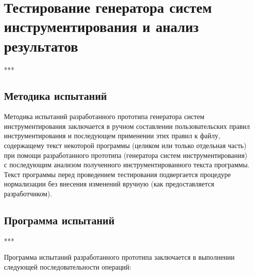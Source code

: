 \chapter{Тестирование генератора систем инструментирования и анализ результатов}

***

\section{Методика испытаний}

Методика испытаний разработанного прототипа генератора систем инструментирования заключается в ручном составлении пользовательских правил инструментирования и последующем применении этих правил к файлу, содержащему текст некоторой программы (целиком или только отдельная часть) при помощи разработанного прототипа (генератора систем инструментирования) с последующим анализом полученного инструментированного текста программы.
Текст программы перед проведением тестирования подвергается процедуре нормализации без внесения изменений вручную (как предоставляется разработчиком).

\section{Программа испытаний}

***

Программа испытаний разработанного прототипа заключается в выполнении следующей последовательности операций:

